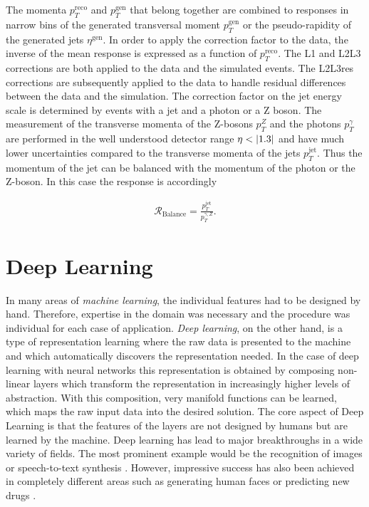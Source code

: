 \documentclass[12pt, a4paper]{thesis}
\begin{document}
The momenta \(p^{\text{reco}}_T\) and \(p^{\text{gen}}_T\) that belong
together are combined to responses in narrow bins of the generated
transversal moment \(p^{\text{gen}}_T\) or the pseudo-rapidity of the
generated jets \(\eta^{\text{gen}}\). In order to apply the correction
factor to the data, the inverse of the mean response is expressed as a
function of \(p^{\text{reco}}_T\). The L1 and L2L3 corrections are
both applied to the data and the simulated events.  The L2L3res
corrections are subsequently applied to the data to handle residual
differences between the data and the simulation. The correction factor
on the jet energy scale is determined by events with a jet and a
photon or a Z boson. The measurement of the transverse momenta of the
Z-bosons $p_T^Z$ and the photons \(p_T^{\gamma}\) are performed in the
well understood detector range \(\eta < \abs{1.3}\) and have much
lower uncertainties compared to the transverse momenta of the jets
\(p_T^{\text{jet}}\). Thus the momentum of the jet can be balanced
with the momentum of the photon or the Z-boson. In this case the
response is accordingly

\begin{align}
  \mathcal{R}_{\text{Balance}}=\frac{p_T^{\text{jet}}}{p_T^{\gamma,Z}}.
\end{align}

\chapter{Deep Learning}
\label{sec:org1ca4c32}

In many areas of \emph{machine learning}, the individual features had
to be designed by hand. Therefore, expertise in the domain was
necessary and the procedure was individual for each case of
application. \emph{Deep learning}, on the other hand, is a type of
representation learning where the raw data is presented to the machine
and which automatically discovers the representation needed. In the
case of deep learning with neural networks this representation is
obtained by composing non-linear layers which transform the
representation in increasingly higher levels of abstraction.  With
this composition, very manifold functions can be learned, which maps
the raw input data into the desired solution. The core aspect of Deep
Learning is that the features of the layers are not designed by humans
but are learned by the machine.  Deep learning has lead to major
breakthroughs in a wide variety of fields. The most prominent example
would be the recognition of images
\cite{szegedy15,NIPS2014_5573,farabet13,krizhevsky17} or
speech-to-text synthesis
\cite{mikolov11_strat,hinton-speech,sainath13_deep}. However,
impressive success has also been achieved in completely different
areas such as generating human faces
\cite{karras17_progr_growin_gans_improv_qualit_stabil_variat} or
predicting new drugs \cite{ma15_deep_neural_nets_as_method}.
\end{document}
